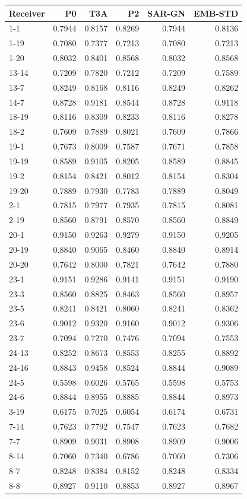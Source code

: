 \begin{tabular}{lrrrrr}
\toprule
Receiver & P0 & T3A & P2 & SAR-GN & EMB-STD \\
\midrule
1-1 & 0.7944 & 0.8157 & 0.8269 & 0.7944 & 0.8136 \\
1-19 & 0.7080 & 0.7377 & 0.7213 & 0.7080 & 0.7213 \\
1-20 & 0.8032 & 0.8401 & 0.8568 & 0.8032 & 0.8568 \\
13-14 & 0.7209 & 0.7820 & 0.7212 & 0.7209 & 0.7589 \\
13-7 & 0.8249 & 0.8168 & 0.8116 & 0.8249 & 0.8262 \\
14-7 & 0.8728 & 0.9181 & 0.8544 & 0.8728 & 0.9118 \\
18-19 & 0.8116 & 0.8309 & 0.8233 & 0.8116 & 0.8278 \\
18-2 & 0.7609 & 0.7889 & 0.8021 & 0.7609 & 0.7866 \\
19-1 & 0.7673 & 0.8009 & 0.7587 & 0.7671 & 0.7858 \\
19-19 & 0.8589 & 0.9105 & 0.8205 & 0.8589 & 0.8845 \\
19-2 & 0.8154 & 0.8421 & 0.8012 & 0.8154 & 0.8304 \\
19-20 & 0.7889 & 0.7930 & 0.7783 & 0.7889 & 0.8049 \\
2-1 & 0.7815 & 0.7977 & 0.7935 & 0.7815 & 0.8081 \\
2-19 & 0.8560 & 0.8791 & 0.8570 & 0.8560 & 0.8849 \\
20-1 & 0.9150 & 0.9263 & 0.9279 & 0.9150 & 0.9205 \\
20-19 & 0.8840 & 0.9065 & 0.8460 & 0.8840 & 0.8914 \\
20-20 & 0.7642 & 0.8000 & 0.7821 & 0.7642 & 0.7880 \\
23-1 & 0.9151 & 0.9286 & 0.9141 & 0.9151 & 0.9190 \\
23-3 & 0.8560 & 0.8825 & 0.8463 & 0.8560 & 0.8957 \\
23-5 & 0.8241 & 0.8421 & 0.8060 & 0.8241 & 0.8362 \\
23-6 & 0.9012 & 0.9320 & 0.9160 & 0.9012 & 0.9306 \\
23-7 & 0.7094 & 0.7270 & 0.7476 & 0.7094 & 0.7553 \\
24-13 & 0.8252 & 0.8673 & 0.8553 & 0.8255 & 0.8892 \\
24-16 & 0.8843 & 0.9458 & 0.8524 & 0.8844 & 0.9089 \\
24-5 & 0.5598 & 0.6026 & 0.5765 & 0.5598 & 0.5753 \\
24-6 & 0.8844 & 0.8955 & 0.8885 & 0.8844 & 0.8973 \\
3-19 & 0.6175 & 0.7025 & 0.6054 & 0.6174 & 0.6731 \\
7-14 & 0.7623 & 0.7792 & 0.7547 & 0.7623 & 0.7682 \\
7-7 & 0.8909 & 0.9031 & 0.8908 & 0.8909 & 0.9006 \\
8-14 & 0.7060 & 0.7340 & 0.6786 & 0.7060 & 0.7306 \\
8-7 & 0.8248 & 0.8384 & 0.8152 & 0.8248 & 0.8334 \\
8-8 & 0.8927 & 0.9110 & 0.8853 & 0.8927 & 0.8967 \\
\bottomrule\end{tabular}
